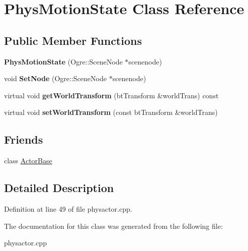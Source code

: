 \hypertarget{classPhysMotionState}{
\section{PhysMotionState Class Reference}
\label{d2/d14/classPhysMotionState}
}
\subsection*{Public Member Functions}
\begin{DoxyCompactItemize}
\item 
\hypertarget{classPhysMotionState_a9c315b85bc405a36a6bd9d9a9f68c34a}{
{\bfseries PhysMotionState} (Ogre::SceneNode $\ast$scenenode)}
\label{d2/d14/classPhysMotionState_a9c315b85bc405a36a6bd9d9a9f68c34a}

\item 
\hypertarget{classPhysMotionState_a4ba21f0b58f33197b61cf1a9754027bc}{
void {\bfseries SetNode} (Ogre::SceneNode $\ast$scenenode)}
\label{d2/d14/classPhysMotionState_a4ba21f0b58f33197b61cf1a9754027bc}

\item 
\hypertarget{classPhysMotionState_ad7f6fc932da90cc2a718fbe809d95287}{
virtual void {\bfseries getWorldTransform} (btTransform \&worldTrans) const }
\label{d2/d14/classPhysMotionState_ad7f6fc932da90cc2a718fbe809d95287}

\item 
\hypertarget{classPhysMotionState_a57c23b922e2c5e8af87dc1318796ec8b}{
virtual void {\bfseries setWorldTransform} (const btTransform \&worldTrans)}
\label{d2/d14/classPhysMotionState_a57c23b922e2c5e8af87dc1318796ec8b}

\end{DoxyCompactItemize}
\subsection*{Friends}
\begin{DoxyCompactItemize}
\item 
\hypertarget{classPhysMotionState_ac09063d4b0192680ba3aa0bd4003a274}{
class \hyperlink{classPhysMotionState_ac09063d4b0192680ba3aa0bd4003a274}{ActorBase}}
\label{d2/d14/classPhysMotionState_ac09063d4b0192680ba3aa0bd4003a274}

\end{DoxyCompactItemize}


\subsection{Detailed Description}


Definition at line 49 of file physactor.cpp.

The documentation for this class was generated from the following file:\begin{DoxyCompactItemize}
\item 
physactor.cpp\end{DoxyCompactItemize}

